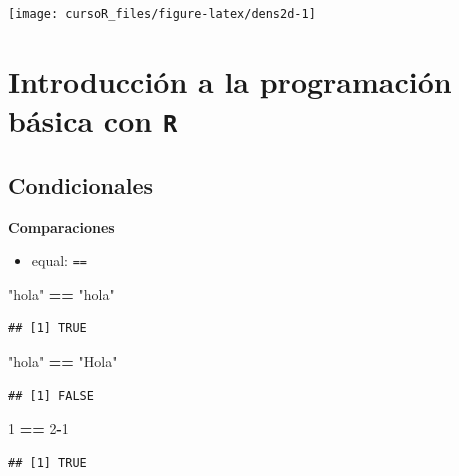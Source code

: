 \documentclass[]{book}
\newenvironment{Shaded}{\begin{snugshade}}{\end{snugshade}}
\newcommand{\DecValTok}[1]{\textcolor[rgb]{0.00,0.00,0.81}{#1}}
\newcommand{\StringTok}[1]{\textcolor[rgb]{0.31,0.60,0.02}{#1}}
\newcommand{\OperatorTok}[1]{\textcolor[rgb]{0.81,0.36,0.00}{\textbf{#1}}}
\providecommand{\tightlist}{%
  \setlength{\itemsep}{0pt}\setlength{\parskip}{0pt}}
\begin{document}
\begin{center}\texttt{[image: cursoR\_files/figure-latex/dens2d-1]} \end{center}

\chapter{\texorpdfstring{Introducción a la programación básica con
\texttt{R}}{Introducción a la programación básica con R}}\label{introducciuxf3n-a-la-programaciuxf3n-buxe1sica-con-r}

\section{Condicionales}\label{condicionales}

\textbf{Comparaciones}

\begin{itemize}
\tightlist
\item
  equal: \texttt{==}
\end{itemize}

\begin{Shaded}
\begin{Highlighting}[]
  \StringTok{"hola"} \OperatorTok{==}\StringTok{ "hola"}
\end{Highlighting}
\end{Shaded}

\begin{verbatim}
## [1] TRUE
\end{verbatim}

\begin{Shaded}
\begin{Highlighting}[]
  \StringTok{"hola"} \OperatorTok{==}\StringTok{ "Hola"}
\end{Highlighting}
\end{Shaded}

\begin{verbatim}
## [1] FALSE
\end{verbatim}

\begin{Shaded}
\begin{Highlighting}[]
   \DecValTok{1} \OperatorTok{==}\StringTok{ }\DecValTok{2}\OperatorTok{-}\DecValTok{1}
\end{Highlighting}
\end{Shaded}

\begin{verbatim}
## [1] TRUE
\end{verbatim}
\end{document}
